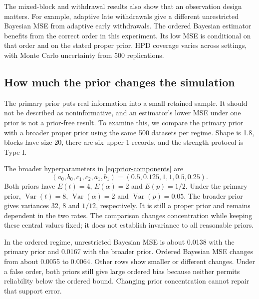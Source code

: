 The mixed-block and withdrawal results also show that an observation design matters. For example, adaptive late withdrawals give a different unrestricted Bayesian MSE from adaptive early withdrawals. The ordered Bayesian estimator benefits from the correct order in this experiment. Its low MSE is conditional on that order and on the stated proper prior. HPD coverage varies across settings, with Monte Carlo uncertainty from 500 replications.

\FloatBarrier

\subsection{How much the prior changes the simulation}\label{sec:prior-extra}
The primary prior puts real information into a small retained sample. It should not be described as noninformative, and an estimator's lower MSE under one prior is not a prior-free result. To examine this, we compare the primary prior with a broader proper prior using the same 500 datasets per regime. Shape is 1.8, blocks have size 20, there are six upper 1-records, and the strength protocol is Type I.

The broader hyperparameters in \eqref{eq:prior-components} are
\begin{equation}
(a_0,b_0,c_1,c_2,a_1,b_1)=(0.5,0.125,1,1,0.5,0.25).\label{eq:broader-prior}
\end{equation}
Both priors have $E(t)=4$, $E(\alpha)=2$ and $E(p)=1/2$. Under the primary prior, $\operatorname{Var}(t)=8$, $\operatorname{Var}(\alpha)=2$ and $\operatorname{Var}(p)=0.05$. The broader prior gives variances 32, 8 and $1/12$, respectively. It is still a proper prior and remains dependent in the two rates. The comparison changes concentration while keeping these central values fixed; it does not establish invariance to all reasonable priors.



In the ordered regime, unrestricted Bayesian MSE is about 0.0138 with the primary prior and 0.0167 with the broader prior. Ordered Bayesian MSE changes from about 0.0055 to 0.0064. Other rows show smaller or different changes. Under a false order, both priors still give large ordered bias because neither permits reliability below the ordered bound. Changing prior concentration cannot repair that support error.

